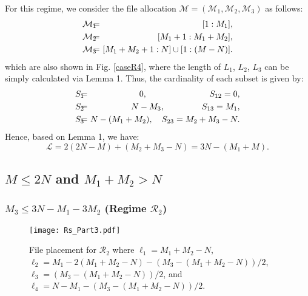 \documentclass[conference]{IEEEtran}
\begin{document}
For this regime, we consider the file allocation $\mathcal{M}=(\mathcal{M}_1,\mathcal{M}_2,\mathcal{M}_3)$ as follows:
\begin{eqnarray}
\mathcal{M}_1&\!\!\!\!=\!\!\!\!&[1:M_1],\notag\\
\mathcal{M}_2&\!\!\!\!=\!\!\!\!&[M_1+1:M_1+M_2],\\
\mathcal{M}_3&\!\!\!\!=\!\!\!\!&[M_1+M_2+1:N]\cup [1:(M-N)].\notag
\end{eqnarray}
which are also shown in Fig. \ref{caseR4}, where the length of $L_1$, $L_2$, $L_3$ can be simply calculated via Lemma 1. Thus, the cardinality of each subset is given by:
\begin{eqnarray}
S_1&\!\!\!\!=\!\!\!\!&0,~~~~~~~~~~~~~~~~~~~~~~S_{12} = 0,\notag\\
S_2&\!\!\!\!=\!\!\!\!&N-M_3,~~~~~~~~~~~~~S_{13} = M_1,\notag\\
S_3&\!\!\!\!=\!\!\!\!&N-(M_1+M_2),~~~S_{23} = M_2+M_3-N.
\end{eqnarray}
Hence, based on Lemma 1, we have:
\begin{equation}
{\mathcal L}=2(2N\!-\!M)+(M_2\!+\!M_3\!-\!N)=3N-(M_1+M).
\end{equation}


\subsection{$M\leq 2N$ and $M_1+M_2> N$}


\subsubsection{$M_3\leq 3N-M_1-3M_2$ (Regime $\mathcal{R}_2$)}

\begin{figure}[!t] \centering %
\texttt{[image: Rs\_Part3.pdf]}\vspace{-0.2in}
\caption{File placement for ${\mathcal R}_2$ where ${\ell}_1=M_1+M_2-N$, ${\ell}_2=M_1-2(M_1+M_2-N)-(M_3-(M_1+M_2-N))/2$, ${\ell}_3=(M_3-(M_1+M_2-N))/2$, and ${\ell}_4=N-M_1-(M_3-(M_1+M_2-N))/2$.}\label{caseR2}\vspace{-0.1in}
\end{figure}
\end{document}
